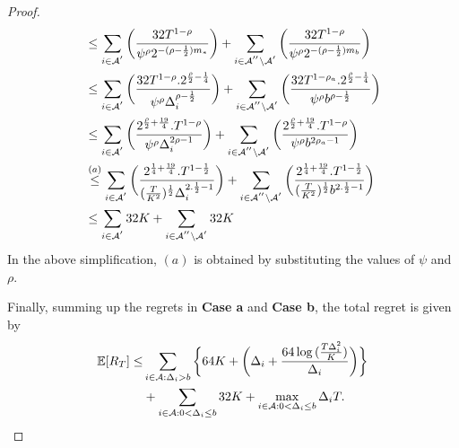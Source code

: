 \begin{proof}
\begin{align*}
&\leq\sum_{i\in \mathcal{A}^{'}}\bigg(\dfrac{32T^{1-\rho}}{\psi^{\rho}2^{-(\rho -\frac{1}{2})m_{*}}} \bigg)+\sum_{i\in \mathcal{A}^{''}\setminus \mathcal{A}^{'}}\bigg(\dfrac{32T^{1-\rho }}{\psi^{\rho}2^{-(\rho -\frac{1}{2})m_{b}}} \bigg)\\
&\leq\sum_{i\in \mathcal{A}^{'}}\bigg(\dfrac{32T^{1-\rho}.2^{\frac{\rho}{2}-\frac{1}{4}}}{\psi^{\rho}\Delta_{i}^{\rho -\frac{1}{2}}} \bigg)+\sum_{i\in \mathcal{A}^{''}\setminus \mathcal{A}^{'}}\bigg(\dfrac{32T^{1-\rho_{a}}.2^{\frac{\rho}{2}-\frac{1}{4}}}{\psi^{\rho}b^{\rho -\frac{1}{2}}} \bigg)\\
&\leq\sum_{i\in \mathcal{A}^{'}}\bigg(\dfrac{2^{\frac{\rho}{2}+\frac{19}{4}}.T^{1-\rho } }{\psi^{\rho}\Delta_{i}^{2\rho -1}} \bigg)+\sum_{i\in \mathcal{A}^{''}\setminus \mathcal{A}^{'}}\bigg(\dfrac{2^{\frac{\rho}{2}+\frac{19}{4}}.T^{1-\rho} }{\psi^{\rho }b^{2\rho_{a}-1}} \bigg)\\
&\overset{(a)}{\leq}\sum_{i\in \mathcal{A}^{'}}\bigg(\dfrac{2^{\frac{1}{4}+\frac{19}{4}}.T^{1-\frac{1}{2} } }{(\frac{T}{K^2})^{\frac{1}{2}}\Delta_{i}^{2.\frac{1}{2} -1}} \bigg)+\sum_{i\in \mathcal{A}^{''}\setminus \mathcal{A}^{'}}\bigg(\dfrac{2^{\frac{1}{4}+\frac{19}{4}}.T^{1-\frac{1}{2}} }{(\frac{T}{K^2})^{\frac{1}{2} }b^{2.\frac{1}{2}-1}} \bigg)\\
&\leq\sum_{i\in \mathcal{A}^{'}}32 K +\sum_{i\in \mathcal{A}^{''}\setminus \mathcal{A}^{'}}32 K
\end{align*}
In the above simplification, $(a)$ is obtained by substituting the values of $\psi$ and $\rho$.

Finally, summing up the regrets in \textbf{Case a} and \textbf{Case b}, the total regret is given by
\begin{align*}
\mathbb{E} [R_{T}] \leq &\sum\limits_{i\in \mathcal{A} :\Delta_{i} > b}\bigg\lbrace 64 K + \bigg(\Delta_{i}+\dfrac{64\log{(\frac{T\Delta_{i}^{2}}{K})}}{\Delta_{i}}\bigg)\bigg \rbrace\\ 
  & +\sum\limits_{i\in \mathcal{A} :0 < \Delta_{i}\leq b} 32 K + \max_{i\in \mathcal{A} :0 < \Delta_{i}\leq b}\Delta_{i}T.
\end{align*}
\end{proof}


